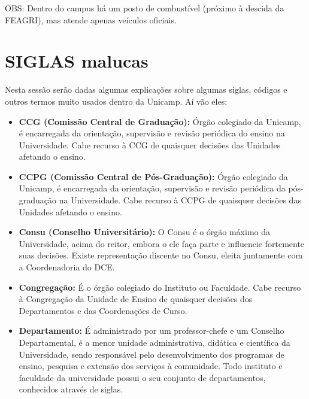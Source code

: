 OBS: Dentro do campus há um posto de combustível (próximo à descida da FEAGRI),
mas atende apenas veículos oficiais.
\twocolumn
\section{SIGLAS malucas}

Nesta sessão serão dadas algumas explicações sobre algumas siglas, códigos
e outros termos muito usados dentro da Unicamp. Aí vão eles:

\begin{itemize}
\item  \textbf{CCG (Comissão Central de Graduação):} Órgão colegiado da Unicamp, é encarregada da orientação, supervisão e revisão periódica do ensino na Universidade. Cabe recurso à CCG de quaisquer decisões das Unidades afetando o ensino.
\end{itemize}

\begin{itemize}
\item  \textbf{CCPG (Comissão Central de Pós-Graduação):} Órgão colegiado da Unicamp, é encarregada da orientação, supervisão e revisão periódica da pós-graduação na Universidade. Cabe recurso à CCPG de quaisquer decisões das Unidades afetando o ensino.
\end{itemize}

\begin{itemize}
\item  \textbf{Consu (Conselho Universitário):} O Consu é o órgão máximo da
Universidade, acima do reitor, embora o ele faça parte e influencie fortemente suas decisões.
Existe representação discente no Consu, eleita juntamente com a Coordenadoria do DCE.
\end{itemize}

\begin{itemize}
\item  \textbf{Congregação:} É o órgão colegiado do Instituto ou Faculdade. Cabe recurso à Congregação da Unidade de Ensino de quaisquer decisões dos Departamentos e das Coordenações de Curso.
\end{itemize}

\begin{itemize}
\item  \textbf{Departamento:} É administrado por um professor-chefe e um Conselho Departamental, é a menor unidade administrativa, didática e científica da Universidade, sendo responsável pelo desenvolvimento dos programas de ensino, pesquisa e extensão dos serviços à comunidade. Todo instituto e faculdade da universidade possui o seu conjunto de departamentos, conhecidos através de siglas.
\end{itemize}

